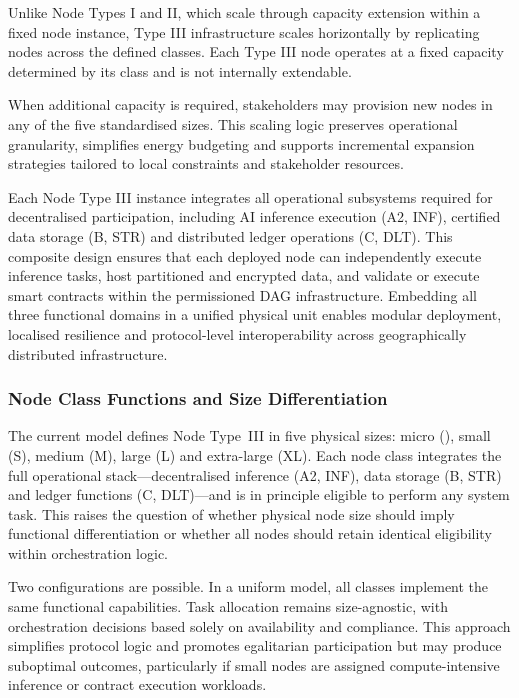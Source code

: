\documentclass[oneside,10pt]{swissi}
\begin{document}
Unlike Node Types I and II, which scale through capacity extension within a fixed node instance, Type III infrastructure scales horizontally by replicating nodes across the defined classes. Each Type III node operates at a fixed capacity determined by its class and is not internally extendable.

When additional capacity is required, stakeholders may provision new nodes in any of the five standardised sizes. This scaling logic preserves operational granularity, simplifies energy budgeting and supports incremental expansion strategies tailored to local constraints and stakeholder resources.

Each Node Type III instance integrates all operational subsystems required for decentralised participation, including AI inference execution (A2, INF), certified data storage (B, STR) and distributed ledger operations (C, DLT). This composite design ensures that each deployed node can independently execute inference tasks, host partitioned and encrypted data, and validate or execute smart contracts within the permissioned DAG infrastructure. Embedding all three functional domains in a unified physical unit enables modular deployment, localised resilience and protocol-level interoperability across geographically distributed infrastructure.\\

\subsubsection{Node Class Functions and Size Differentiation}
\label{subsubsec:typeIII-differentiation}

The current model defines Node Type~III in five physical sizes: micro (\textmu), small (S), medium (M), large (L) and extra-large (XL). Each node class integrates the full operational stack—decentralised inference (A2, INF), data storage (B, STR) and ledger functions (C, DLT)—and is in principle eligible to perform any system task. This raises the question of whether physical node size should imply functional differentiation or whether all nodes should retain identical eligibility within orchestration logic.

Two configurations are possible. In a uniform model, all classes implement the same functional capabilities. Task allocation remains size-agnostic, with orchestration decisions based solely on availability and compliance. This approach simplifies protocol logic and promotes egalitarian participation but may produce suboptimal outcomes, particularly if small nodes are assigned compute-intensive inference or contract execution workloads.
\end{document}
